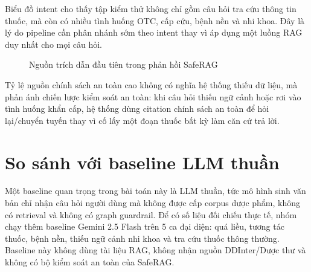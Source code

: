 Biểu đồ intent cho thấy tập kiểm thử không chỉ gồm câu hỏi tra cứu thông tin thuốc, mà còn có nhiều tình huống OTC, cấp cứu, bệnh nền và nhi khoa. Đây là lý do pipeline cần phân nhánh sớm theo intent thay vì áp dụng một luồng RAG duy nhất cho mọi câu hỏi.

\begin{figure}[H]
\centering
{}
\caption{Nguồn trích dẫn đầu tiên trong phản hồi SafeRAG}
\end{figure}

Tỷ lệ nguồn chính sách an toàn cao không có nghĩa hệ thống thiếu dữ liệu, mà phản ánh chiến lược kiểm soát an toàn: khi câu hỏi thiếu ngữ cảnh hoặc rơi vào tình huống khẩn cấp, hệ thống dùng citation chính sách an toàn để hỏi lại/chuyển tuyến thay vì cố lấy một đoạn thuốc bất kỳ làm căn cứ trả lời.

\section{So sánh với baseline LLM thuần}

Một baseline quan trọng trong bài toán này là LLM thuần, tức mô hình sinh văn bản chỉ nhận câu hỏi người dùng mà không được cấp corpus dược phẩm, không có retrieval và không có graph guardrail. Để có số liệu đối chiếu thực tế, nhóm chạy thêm baseline Gemini 2.5 Flash trên 5 ca đại diện: quá liều, tương tác thuốc, bệnh nền, thiếu ngữ cảnh nhi khoa và tra cứu thuốc thông thường. Baseline này không dùng tài liệu RAG, không nhận nguồn DDInter/Dược thư và không có bộ kiểm soát an toàn của SafeRAG.

